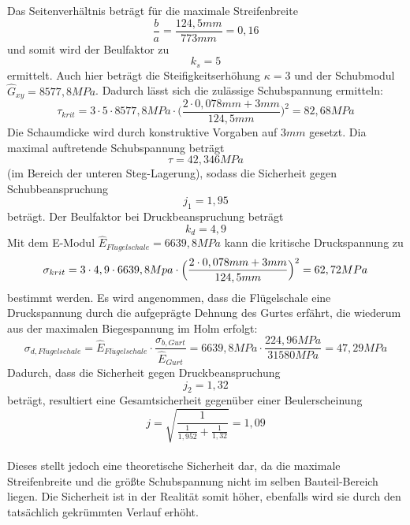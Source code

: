 \noindent Das Seitenverhältnis beträgt für die maximale Streifenbreite
\begin{equation}
	\frac{b}{a}=\frac{124,5 mm}{773 mm}=0,16
\end{equation}
und somit wird der Beulfaktor zu 
\begin{equation}
	k_{s}=5
\end{equation} 
ermittelt. Auch hier beträgt die Steifigkeitserhöhung $\kappa=3$ und der Schubmodul $\hat{G}_{xy}=8577,8 MPa$. Dadurch lässt sich die zulässige Schubspannung ermitteln:
\begin{equation}
	\tau_{krit}=3\cdot 5\cdot 8577,8 MPa\cdot\biggl(\frac{2\cdot 0,078mm + 3mm}{124,5 mm}\biggr)^{2} =82,68 MPa
\end{equation}
Die Schaumdicke wird durch konstruktive Vorgaben auf $3 mm$ gesetzt. Dia maximal auftretende Schubspannung beträgt
\begin{equation}
	\tau=42,346 MPa
\end{equation}
(im Bereich der unteren Steg-Lagerung), sodass die Sicherheit gegen Schubbeanspruchung 
\begin{equation}
	j_{1}=1,95
\end{equation}
beträgt. Der Beulfaktor bei Druckbeanspruchung beträgt
\begin{equation}
	k_{d} = 4,9
\end{equation}
Mit dem E-Modul $\hat{E}_{Fl\ddot{u}gelschale} = 6639,8 MPa$ kann die kritische Druckspannung zu
\begin{equation}
	\sigma_{krit} = 3\cdot 4,9\cdot 6639,8 Mpa\cdot\Bigl(\frac{2\cdot 0,078mm+3mm}{124,5mm}\Bigr)^{2}=62,72 MPa
\end{equation}
bestimmt werden. Es wird angenommen, dass die Flügelschale eine Druckspannung durch die aufgeprägte Dehnung des Gurtes erfährt, die wiederum aus der maximalen Biegespannung im Holm erfolgt:
\begin{equation}
	\sigma_{d,Fl\ddot{u}gelschale}=\hat{E}_{Fl\ddot{u}gelschale}\cdot\frac{\sigma_{b,Gurt}}{\hat{E}_{Gurt}}=6639,8 MPa\cdot\frac{224,96 MPa}{31580 MPa}=47,29 MPa
\end{equation}
Dadurch, dass die Sicherheit gegen Druckbeanspruchung
\begin{equation}
	j_{2}=1,32
\end{equation}
beträgt, resultiert eine Gesamtsicherheit gegenüber einer Beulerscheinung
\begin{equation}
	j=\sqrt{\frac{1}{\frac{1}{1,952}+\frac{1}{1,32}}}=1,09
\end{equation}\\

 \noindent Dieses stellt jedoch eine theoretische Sicherheit dar, da die maximale Streifenbreite und die größte Schubspannung nicht im selben Bauteil-Bereich liegen. Die Sicherheit ist in der Realität somit höher, ebenfalls wird sie durch den tatsächlich gekrümmten Verlauf erhöht.